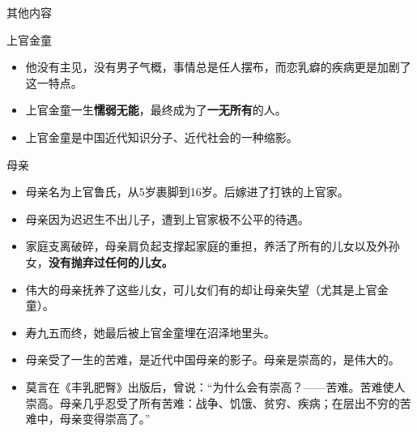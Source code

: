 \documentclass[utf-8]{beamer}
\begin{document}
\begin{section}{其他内容}
\begin{frame}{上官金童}
\begin{itemize}
              \pause
              \item 他没有主见，没有男子气概，事情总是任人摆布，而恋乳癖的疾病更是加剧了这一特点。%
              \pause
              \item 上官金童一生\textbf{懦弱无能}，最终成为了\textbf{一无所有}的人。%
              \pause
              \item 上官金童是中国近代知识分子、近代社会的一种缩影。%
            \end{itemize}
        \end{frame}
        \begin{frame}{母亲}
            \pause
            \begin{itemize}
                \item 母亲名为上官鲁氏，从5岁裹脚到16岁。后嫁进了打铁的上官家。
                \pause
                \item 母亲因为迟迟生不出儿子，遭到上官家\textcolor[rgb]{1.00,0.00,0.00}{极}不公平的待遇。%
                \pause
                \item 家庭支离破碎，母亲肩负起支撑起家庭的重担，养活了所有的儿女以及外孙女，\textbf{没有抛弃过任何的儿女。}
                \pause
                \item 伟大的母亲抚养了这些儿女，可儿女们有的却让母亲失望（尤其是上官金童）。
                \pause
                \item 寿九五而终，她最后被上官金童埋在沼泽地里头。
                \pause
                \item 母亲受了一生的苦难，是近代中国母亲的影子。母亲是崇高的，是伟大的。
                \pause
                \item 莫言在《丰乳肥臀》出版后，曾说：“为什么会有崇高？——苦难。苦难使人崇高。母亲几乎忍受了所有苦难：战争、饥饿、贫穷、疾病；在层出不穷的苦难中，母亲变得崇高了。”
            \end{itemize}
        \end{frame}
    \end{section}
\end{document}
